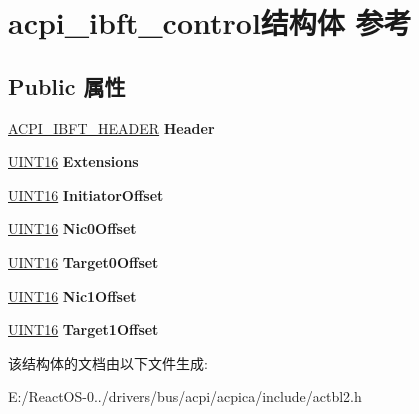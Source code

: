 \hypertarget{structacpi__ibft__control}{}\section{acpi\+\_\+ibft\+\_\+control结构体 参考}
\label{structacpi__ibft__control}
\subsection*{Public 属性}
\begin{DoxyCompactItemize}
\item 
\mbox{\label{structacpi__ibft__control_afd04c8cd3c24a510fa1ed198e3026bd5}} 
\hyperlink{structacpi__ibft__header}{A\+C\+P\+I\+\_\+\+I\+B\+F\+T\+\_\+\+H\+E\+A\+D\+ER} {\bfseries Header}
\item 
\mbox{\label{structacpi__ibft__control_ac5601c1e83083e4e1fd43d16f17a70d1}} 
\hyperlink{_processor_bind_8h_a09f1a1fb2293e33483cc8d44aefb1eb1}{U\+I\+N\+T16} {\bfseries Extensions}
\item 
\mbox{\label{structacpi__ibft__control_adda4f75da6dbec173dd4bd02125bee9e}} 
\hyperlink{_processor_bind_8h_a09f1a1fb2293e33483cc8d44aefb1eb1}{U\+I\+N\+T16} {\bfseries Initiator\+Offset}
\item 
\mbox{\label{structacpi__ibft__control_a7c7b4a0618d04086f92f52314f3b8fb2}} 
\hyperlink{_processor_bind_8h_a09f1a1fb2293e33483cc8d44aefb1eb1}{U\+I\+N\+T16} {\bfseries Nic0\+Offset}
\item 
\mbox{\label{structacpi__ibft__control_a7a47330359648468d6bf013fc0cb3fd3}} 
\hyperlink{_processor_bind_8h_a09f1a1fb2293e33483cc8d44aefb1eb1}{U\+I\+N\+T16} {\bfseries Target0\+Offset}
\item 
\mbox{\label{structacpi__ibft__control_a23c1bfa8bdbe7c973a676dd64489a799}} 
\hyperlink{_processor_bind_8h_a09f1a1fb2293e33483cc8d44aefb1eb1}{U\+I\+N\+T16} {\bfseries Nic1\+Offset}
\item 
\mbox{\label{structacpi__ibft__control_a1fa734fc48db21880ad6091735eb54e7}} 
\hyperlink{_processor_bind_8h_a09f1a1fb2293e33483cc8d44aefb1eb1}{U\+I\+N\+T16} {\bfseries Target1\+Offset}
\end{DoxyCompactItemize}


该结构体的文档由以下文件生成\+:\begin{DoxyCompactItemize}
\item 
E\+:/\+React\+O\+S-\/0../drivers/bus/acpi/acpica/include/actbl2.\+h\end{DoxyCompactItemize}
